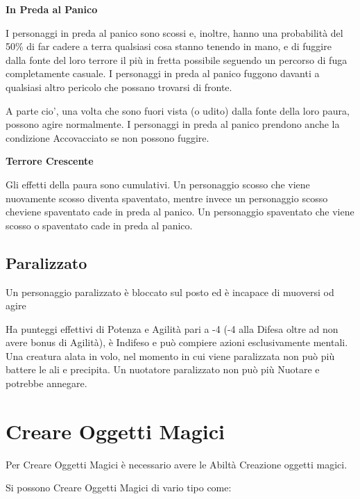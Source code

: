 \documentclass[a4paper,11pt,twoside,openany]{book}
\begin{document}
{\textbf{In Preda al Panico}

I personaggi in preda al panico sono scossi e, inoltre, hanno una probabilità del 50\% di far cadere a terra qualsiasi cosa stanno tenendo in mano, e di fuggire dalla fonte del loro terrore il più in fretta possibile seguendo un percorso di fuga completamente casuale. I personaggi in preda al panico fuggono davanti a qualsiasi altro pericolo che possano trovarsi di fronte. 

A parte cio', una volta che sono fuori vista (o udito) dalla fonte della loro paura, possono agire normalmente. I personaggi in preda al panico prendono anche la condizione Accovacciato se non possono fuggire.

\textbf{Terrore Crescente}

Gli effetti della paura sono cumulativi. Un personaggio scosso che viene nuovamente scosso diventa spaventato, mentre invece un personaggio scosso cheviene spaventato cade in preda al panico. Un personaggio spaventato che viene scosso o spaventato cade in preda al panico.


\subsection{Paralizzato}

\label{paralizzato}

Un personaggio paralizzato è bloccato sul posto ed è incapace di muoversi od agire

Ha punteggi effettivi di Potenza e Agilità pari a -4 (-4 alla Difesa oltre ad non avere bonus di Agilità), è Indifeso e può compiere azioni esclusivamente mentali. Una creatura alata in volo, nel momento in cui viene paralizzata non può più battere le ali e precipita. Un nuotatore paralizzato non può più Nuotare e potrebbe annegare.

\pagebreak

\section{Creare Oggetti Magici}

\label{creare-oggetti-magici}

Per Creare Oggetti Magici è necessario avere le Abiltà Creazione oggetti magici.

Si possono Creare Oggetti Magici di vario tipo come:

\bigskip

}
\end{document}
